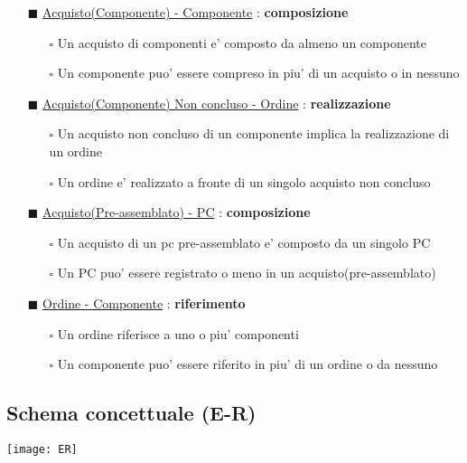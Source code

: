 \begin{itemize}
\item[$\blacksquare$]\underline{Acquisto(Componente) - Componente} : \textbf{composizione}
\begin{itemize}
\item[$\square$]Un acquisto di componenti e' composto da almeno un componente
\item[$\square$]Un componente puo' essere compreso in piu' di un acquisto o in nessuno
\end{itemize} 

\item[$\blacksquare$]\underline{Acquisto(Componente) Non concluso - Ordine} : \textbf{realizzazione}
\begin{itemize}
\item[$\square$]Un acquisto non concluso di un componente implica la realizzazione di un ordine
\item[$\square$]Un ordine e' realizzato a fronte di un singolo acquisto non concluso
\end{itemize}

\item[$\blacksquare$]\underline{Acquisto(Pre-assemblato) - PC} : \textbf{composizione}
\begin{itemize}
\item[$\square$]Un acquisto di un pc pre-assemblato e' composto da un singolo PC
\item[$\square$]Un PC puo' essere registrato o meno in un acquisto(pre-assemblato)
\end{itemize}

\item[$\blacksquare$]\underline{Ordine - Componente} : \textbf{riferimento}
\begin{itemize}
\item[$\square$]Un ordine riferisce a uno o piu' componenti
\item[$\square$]Un componente puo' essere riferito in piu' di un ordine o da nessuno
\end{itemize}


\end{itemize}

\subsection{Schema concettuale (E-R)}

\texttt{[image: ER]}
